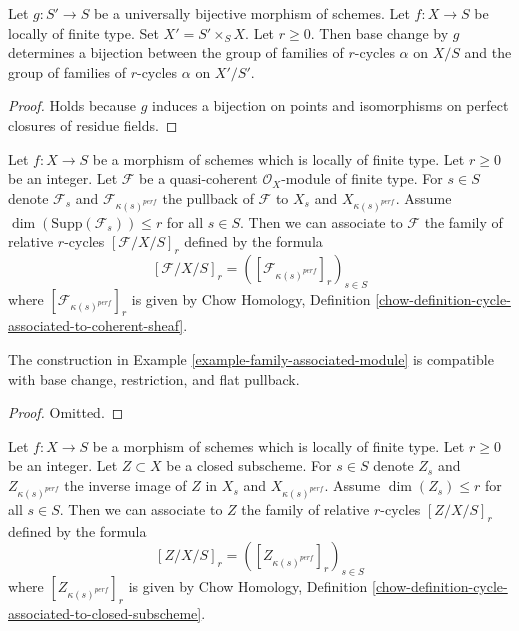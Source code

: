 \begin{lemma}
\label{lemma-pullback-universally-bijective}
Let $g : S' \to S$ be a universally bijective morphism of schemes.
Let $f : X \to S$ be locally of finite type. Set $X' = S' \times_S X$.
Let $r \geq 0$. Then base change by $g$ determines a bijection
between the group of families of $r$-cycles $\alpha$ on $X/S$ and
the group of families of $r$-cycles $\alpha$ on $X'/S'$.
\end{lemma}

\begin{proof}
Holds because $g$ induces a bijection on points and isomorphisms
on perfect closures of residue fields.
\end{proof}

\begin{example}
\label{example-family-associated-module}
Let $f : X \to S$ be a morphism of schemes which is locally of finite type.
Let $r \geq 0$ be an integer. Let $\mathcal{F}$ be a quasi-coherent
$\mathcal{O}_X$-module of finite type. For $s \in S$ denote $\mathcal{F}_s$
and $\mathcal{F}_{\kappa(s)^{perf}}$
the pullback of $\mathcal{F}$ to $X_s$ and $X_{\kappa(s)^{perf}}$.
Assume $\dim(\text{Supp}(\mathcal{F}_s)) \leq r$ for all $s \in S$.
Then we can associate to $\mathcal{F}$ the family of relative
$r$-cycles $[\mathcal{F}/X/S]_r$ defined by the formula
$$
[\mathcal{F}/X/S]_r = ([\mathcal{F}_{\kappa(s)^{perf}}]_r)_{s \in S}
$$
where $[\mathcal{F}_{\kappa(s)^{perf}}]_r$ is given by
Chow Homology, Definition
\ref{chow-definition-cycle-associated-to-coherent-sheaf}.
\end{example}

\begin{lemma}
\label{lemma-family-associated-module}
The construction in Example \ref{example-family-associated-module}
is compatible with base change, restriction,
and flat pullback.
\end{lemma}

\begin{proof}
Omitted.
\end{proof}

\begin{example}
\label{example-family-associated-closed}
Let $f : X \to S$ be a morphism of schemes which is locally of finite type.
Let $r \geq 0$ be an integer. Let $Z \subset X$ be a closed subscheme.
For $s \in S$ denote $Z_s$ and $Z_{\kappa(s)^{perf}}$
the inverse image of $Z$ in $X_s$ and $X_{\kappa(s)^{perf}}$.
Assume $\dim(Z_s) \leq r$ for all $s \in S$.
Then we can associate to $Z$ the family of relative
$r$-cycles $[Z/X/S]_r$ defined by the formula
$$
[Z/X/S]_r = ([Z_{\kappa(s)^{perf}}]_r)_{s \in S}
$$
where $[Z_{\kappa(s)^{perf}}]_r$ is given by
Chow Homology, Definition
\ref{chow-definition-cycle-associated-to-closed-subscheme}.
\end{example}


